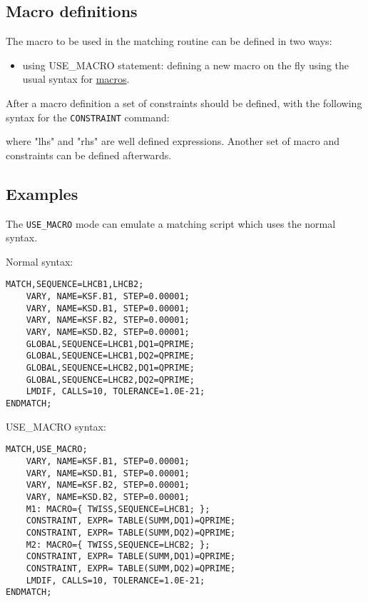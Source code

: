\subsection{Macro definitions}
The macro to be used in the matching routine can be defined in two ways:
 
\begin{itemize}
\item using USE\_MACRO statement:
  defining a new macro on the fly using the usual syntax for
  \href{../control/special.html#macro}{ macros}.  
\end{itemize}
 
After a macro definition a set of constraints should be defined, with
the following syntax for the {\tt CONSTRAINT} command:
 

where "lhs" and "rhs" are well defined \madx expressions. 
Another set of macro and constraints can be defined afterwards. 

\subsection{Examples}
The {\tt USE\_MACRO} mode can emulate a matching script
which uses the normal syntax. 

Normal syntax:
\begin{verbatim}
MATCH,SEQUENCE=LHCB1,LHCB2;
    VARY, NAME=KSF.B1, STEP=0.00001;
    VARY, NAME=KSD.B1, STEP=0.00001;
    VARY, NAME=KSF.B2, STEP=0.00001;
    VARY, NAME=KSD.B2, STEP=0.00001;
    GLOBAL,SEQUENCE=LHCB1,DQ1=QPRIME;
    GLOBAL,SEQUENCE=LHCB1,DQ2=QPRIME;
    GLOBAL,SEQUENCE=LHCB2,DQ1=QPRIME;
    GLOBAL,SEQUENCE=LHCB2,DQ2=QPRIME;
    LMDIF, CALLS=10, TOLERANCE=1.0E-21;
ENDMATCH;
\end{verbatim}

USE\_MACRO syntax:

\begin{verbatim}
MATCH,USE_MACRO;
    VARY, NAME=KSF.B1, STEP=0.00001;
    VARY, NAME=KSD.B1, STEP=0.00001;
    VARY, NAME=KSF.B2, STEP=0.00001;
    VARY, NAME=KSD.B2, STEP=0.00001;
    M1: MACRO={ TWISS,SEQUENCE=LHCB1; };
    CONSTRAINT, EXPR= TABLE(SUMM,DQ1)=QPRIME;
    CONSTRAINT, EXPR= TABLE(SUMM,DQ2)=QPRIME;
    M2: MACRO={ TWISS,SEQUENCE=LHCB2; };
    CONSTRAINT, EXPR= TABLE(SUMM,DQ1)=QPRIME;
    CONSTRAINT, EXPR= TABLE(SUMM,DQ2)=QPRIME;
    LMDIF, CALLS=10, TOLERANCE=1.0E-21;
ENDMATCH;
\end{verbatim}

